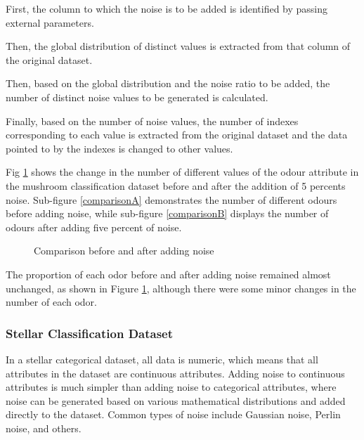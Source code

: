 \documentclass[runningheads,a4paper]{llncs}
\begin{document}
First, the column to which the noise is to be added is identified by passing external parameters.

Then, the global distribution of distinct values is extracted from that column of the original dataset.

Then, based on the global distribution and the noise ratio to be added, the number of distinct noise values to be generated is calculated.

Finally, based on the number of noise values, the number of indexes corresponding to each value is extracted from the original dataset and the data pointed to by the indexes is changed to other values.

Fig \ref{Comparison before and after adding noise} shows the change in the number of different values of the odour attribute in the mushroom classification dataset before and after the addition of 5 percents noise.
Sub-figure \ref{comparisonA} demonstrates the number of different odours before adding noise, while sub-figure \ref{comparisonB} displays the number of odours after adding five percent of noise.
\begin{figure}
    \centering

    \hfill


    \caption{Comparison before and after adding noise}
    \label{Comparison before and after adding noise}
\end{figure}

The proportion of each odor before and after adding noise remained almost unchanged, as shown in Figure \ref{Comparison before and after adding noise}, although there were some minor changes in the number of each odor.

\subsubsection{Stellar Classification Dataset}
In a stellar categorical dataset, all data is numeric, which means that all attributes in the dataset are continuous attributes. Adding noise to continuous attributes is much simpler than adding noise to categorical attributes, where noise can be generated based on various mathematical distributions and added directly to the dataset.
Common types of noise include Gaussian noise, Perlin noise, and others.
\end{document}
